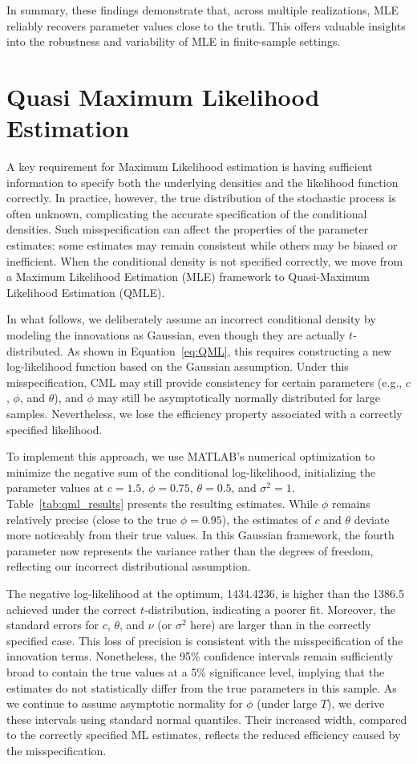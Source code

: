 \documentclass[a4paper,12pt]{article}
\begin{document}
In summary, these findings demonstrate that, across multiple realizations, MLE reliably recovers parameter values close to the truth. This offers valuable insights into the robustness and variability of MLE in finite-sample settings.

\section{Quasi Maximum Likelihood Estimation}
A key requirement for Maximum Likelihood estimation is having sufficient information to specify both the underlying densities and the likelihood function correctly. In practice, however, the true distribution of the stochastic process is often unknown, complicating the accurate specification of the conditional densities. Such misspecification can affect the properties of the parameter estimates: some estimates may remain consistent while others may be biased or inefficient. When the conditional density is not specified correctly, we move from a Maximum Likelihood Estimation (MLE) framework to Quasi-Maximum Likelihood Estimation (QMLE).

In what follows, we deliberately assume an incorrect conditional density by modeling the innovations as Gaussian, even though they are actually \(t\)-distributed. As shown in Equation~\ref{eq:QML}, this requires constructing a new log-likelihood function based on the Gaussian assumption. Under this misspecification, CML may still provide consistency for certain parameters (e.g., \(c\), \(\phi\), and \(\theta\)), and \(\phi\) may still be asymptotically normally distributed for large samples. Nevertheless, we lose the efficiency property associated with a correctly specified likelihood.

To implement this approach, we use MATLAB’s numerical optimization to minimize the negative sum of the conditional log-likelihood, initializing the parameter values at \(c = 1.5\), \(\phi = 0.75\), \(\theta = 0.5\), and \(\sigma^2 = 1\). Table~\ref{tab:qml_results} presents the resulting estimates. While \(\phi\) remains relatively precise (close to the true \(\phi = 0.95\)), the estimates of \(c\) and \(\theta\) deviate more noticeably from their true values. In this Gaussian framework, the fourth parameter now represents the variance rather than the degrees of freedom, reflecting our incorrect distributional assumption.

The negative log-likelihood at the optimum, 1434.4236, is higher than the 1386.5 achieved under the correct \(t\)-distribution, indicating a poorer fit. Moreover, the standard errors for \(c\), \(\theta\), and \(\nu\) (or \(\sigma^2\) here) are larger than in the correctly specified case. This loss of precision is consistent with the misspecification of the innovation terms. Nonetheless, the 95\% confidence intervals remain sufficiently broad to contain the true values at a 5\% significance level, implying that the estimates do not statistically differ from the true parameters in this sample. As we continue to assume asymptotic normality for \(\phi\) (under large \(T\)), we derive these intervals using standard normal quantiles. Their increased width, compared to the correctly specified ML estimates, reflects the reduced efficiency caused by the misspecification.
\end{document}
